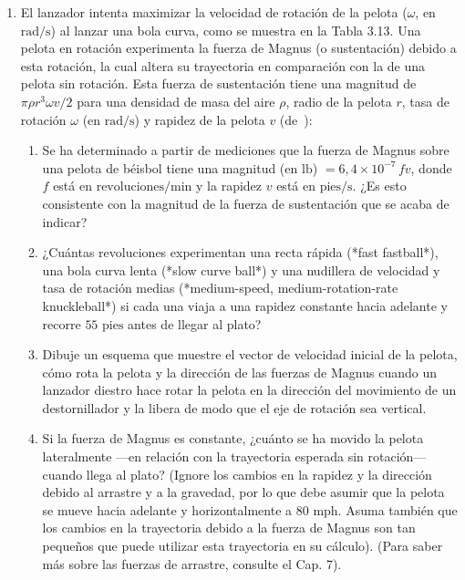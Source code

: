 \documentclass[12pt]{book}
\begin{document}
\begin{enumerate}
\item[3.109] El lanzador intenta maximizar la velocidad de rotación de la pelota ($\omega$, en $\text{rad/s}$) al lanzar una bola curva, como se muestra en la Tabla 3.13. Una pelota en rotación experimenta la fuerza de Magnus (o sustentación) debido a esta rotación, la cual altera su trayectoria en comparación con la de una pelota sin rotación. Esta fuerza de sustentación tiene una magnitud de $\pi \rho r^3 \omega v / 2$ para una densidad de masa del aire $\rho$, radio de la pelota $r$, tasa de rotación $\omega$ (en $\text{rad/s}$) y rapidez de la pelota $v$ (de~\cite{ref137}):
\begin{enumerate}
\item[(a)] Se ha determinado a partir de mediciones que la fuerza de Magnus sobre una pelota de béisbol tiene una magnitud (en $\text{lb}$) $= 6{,}4 \times 10^{-7}\, f v$, donde $f$ está en $\text{revoluciones/min}$ y la rapidez $v$ está en $\text{pies/s}$. ¿Es esto consistente con la magnitud de la fuerza de sustentación que se acaba de indicar?
\item[(b)] ¿Cuántas revoluciones experimentan una recta rápida (*fast fastball*), una bola curva lenta (*slow curve ball*) y una nudillera de velocidad y tasa de rotación medias (*medium-speed, medium-rotation-rate knuckleball*) si cada una viaja a una rapidez constante hacia adelante y recorre $55\text{ pies}$ antes de llegar al plato?
\item[(c)] Dibuje un esquema que muestre el vector de velocidad inicial de la pelota, cómo rota la pelota y la dirección de las fuerzas de Magnus cuando un lanzador diestro hace rotar la pelota en la dirección del movimiento de un destornillador y la libera de modo que el eje de rotación sea vertical.
\item[(d)] Si la fuerza de Magnus es constante, ¿cuánto se ha movido la pelota lateralmente ---en relación con la trayectoria esperada sin rotación--- cuando llega al plato? (Ignore los cambios en la rapidez y la dirección debido al arrastre y a la gravedad, por lo que debe asumir que la pelota se mueve hacia adelante y horizontalmente a $80\text{ mph}$. Asuma también que los cambios en la trayectoria debido a la fuerza de Magnus son tan pequeños que puede utilizar esta trayectoria en su cálculo). (Para saber más sobre las fuerzas de arrastre, consulte el Cap. 7).
\end{enumerate}


\end{enumerate}
\end{document}
